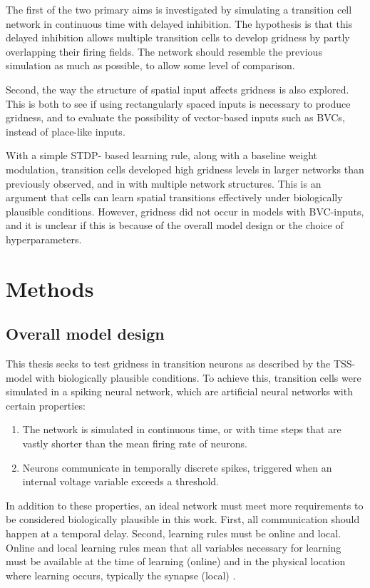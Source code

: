 \documentclass{article}
\begin{document}
    The first of the two primary aims is investigated by simulating a transition cell network in continuous time with delayed inhibition. The hypothesis is that this delayed inhibition allows multiple transition cells to develop gridness by partly overlapping their firing fields. The network should resemble the previous simulation as much as possible, to allow some level of comparison.

    Second, the way the structure of spatial input affects gridness is also explored. This is both to see if using rectangularly spaced inputs is necessary to produce gridness, and to evaluate the possibility of vector-based inputs such as BVCs, instead of place-like inputs.

    With a simple STDP- based learning rule, along with a baseline weight modulation, transition cells developed high gridness levels in larger networks than previously observed, and in with multiple network structures. This is an argument that cells can learn spatial transitions effectively under biologically plausible conditions. However, gridness did not occur in models with BVC-inputs, and it is unclear if this is because of the overall model design or the choice of hyperparameters.
    
    \newpage
    \section{Methods} \label{Methods}
    \subsection{Overall model design} \label{Overall Method}
    This thesis seeks to test gridness in transition neurons as described by the TSS-model with biologically plausible conditions. To achieve this, transition cells were simulated in a spiking neural network, which are artificial neural networks with certain properties:
    \begin{enumerate}
        \item The network is simulated in continuous time, or with time steps that are vastly shorter than the mean firing rate of neurons.
        \item Neurons communicate in temporally discrete spikes, triggered when an internal voltage variable exceeds a threshold.
    \end{enumerate}

    In addition to these properties, an ideal network must meet more requirements to be considered biologically plausible in this work. First, all communication should happen at a temporal delay. Second, learning rules must be online and local. Online and local learning rules mean that all variables necessary for learning must be available at the time of learning (online) and in the physical location where learning occurs, typically the synapse (local) \parencite{VanDerVeen2022}. 
    
\end{document}
